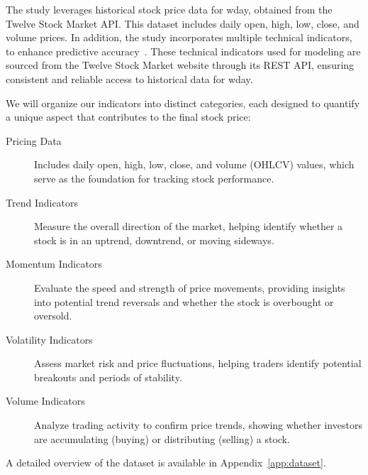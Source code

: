 The study leverages historical stock price data for \acrshort{wday}, obtained from the
Twelve Stock Market API. This dataset includes daily open, high, low, close, and volume prices. In
addition, the study incorporates multiple technical indicators, to
enhance predictive accuracy~\parencite{parmar2018stock, nabipour2020DeepLearning,
guo2024LSTMStock}. These technical indicators used for modeling are sourced from the Twelve Stock Market website through its REST API, ensuring consistent and reliable access to historical data for \acrshort{wday}.

We will organize our indicators into distinct categories, each designed to quantify a unique aspect that contributes to the final stock price:

\begin{description}
    \item[Pricing Data] Includes daily open, high, low, close, and volume (OHLCV) values,
    which serve as the foundation for tracking stock performance.
    \item[Trend Indicators] Measure the overall direction of the market, helping identify 
    whether a stock is in an uptrend, downtrend, or moving sideways.
    \item[Momentum Indicators] Evaluate the speed and strength of price movements, providing
    insights into potential trend reversals and whether the stock is overbought or oversold.
    \item[Volatility Indicators] Assess market risk and price fluctuations, helping traders 
    identify potential breakouts and periods of stability.
    \item[Volume Indicators] Analyze trading activity to confirm price trends, showing
    whether investors are accumulating (buying) or distributing (selling) a stock.
\end{description}

A detailed overview of the dataset is available in Appendix~\ref{app:dataset}.

